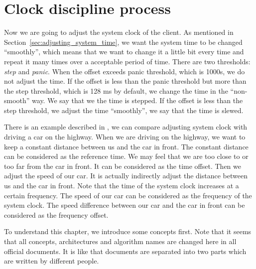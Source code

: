 

\chapter{Clock discipline process}%
\label{cha:clock_discipline_process}
Now we are going to adjust the system clock of the client. As mentioned in 
Section~\ref{sec:adjusting_system_time}, we want the system time to be changed
``smoothly'', which means that we want to change it a little bit every time and 
repeat it many times over a acceptable period of time. There are two
thresholds: \emph{step} and \emph{panic}. When the offset exceeds panic
threshold, which is 1000s, we do not adjust the time. If the offset is less
than the panic threshold but more than the step threshold, which is 128 ms
by default, we change the time in the ``non-smooth'' way. We say that we the
time is stepped. If the offset is less than the step threshold, we adjust the
time ``smoothly'', we say that the time is slewed.

There is an example described in \cite{redbook}, we can compare adjusting
system clock with driving a car on the highway. When we are driving on the
highway, we want to keep a constant distance between us and the car in front.
The constant distance can be considered as the reference time. We may feel that
we are too close to or too far from the car in front. It can be considered as
the time offset. Then we adjust the speed of our car. It is actually indirectly
adjust the distance between us and the car in front. Note that the time of
the system clock increases at a certain frequency. The speed of our car can be
considered as the frequency of the system clock. The speed difference between
our car and the car in front can be considered as the frequency offset.

To understand this chapter, we introduce some concepts first. Note that it
seems that all concepts, architectures and algorithm names are changed here in
all official documents. It is like that documents are separated into two parts
which are written by different people.

